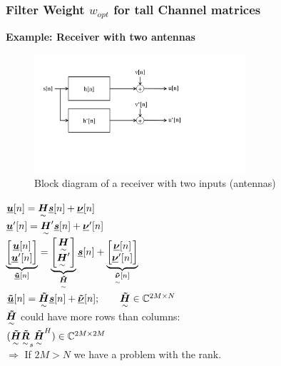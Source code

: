 \begin{doublespace}
\subsubsection{Filter Weight \texorpdfstring{$w_{opt}$}{w-opt} for tall Channel matrices}
\textbf{Example: Receiver with two antennas}
\begin{figure}[htbp]
	\centering
		\includegraphics[trim =1cm 5cm 5cm 2cm, clip, width=0.70\textwidth]{graphics/Block_diagram_2_antenna_RX.pdf}
	\caption{Block diagram of a receiver with two inputs (antennas)}
	\label{fig:Block_diagram_2_antenna_RX}
\end{figure}

$\vec{u}[n] = \ma{H} \vec{s}[n] + \vec{\nu}[n]$\\
$\vec{u}'[n] = \ma{H}' \vec{s}[n] + \vec{\nu}'[n]$\\
$\underbrace{\mat{\vec{u}[n]\\ \vec{u}'[n]}}_{\vec{\tilde{u}}[n]} = \underbrace{\mat{\ma{H}\\ \ma{H}'}}_{\ma{\tilde{H}}} \vec{s}[n] + \underbrace{\mat{\vec{\nu}[n]\\ \vec{\nu}'[n]}}_{\ma{\tilde{\nu}}[n]}$\\
$\vec{\tilde{u}}[n] = \ma{\tilde{H}} \vec{s}[n] + \vec{\tilde{\nu}}[n]; \qquad \ma{\tilde{H}}\in \mathbb{C}^{2M\times N}$\\
$\ma{\tilde{H}}$ could have more rows than columns:\\
$(\ma{\tilde{H}}\ma{\tilde{R}}_s\ma{\tilde{H}}^H)\in\mathbb{C}^{2M\times 2M}$\\
$\Rightarrow$ If $2M > N$ we have a problem with the rank.
\\ \ \\

\\


\end{doublespace}
